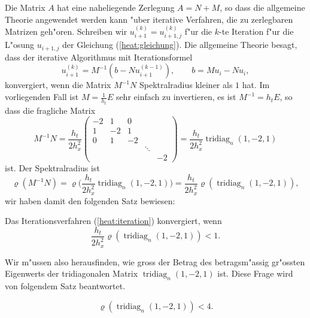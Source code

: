 Die Matrix $A$ hat eine naheliegende Zerlegung $A=N+M$, so dass
die allgemeine Theorie angewendet werden kann "uber iterative Verfahren,
die zu zerlegbaren Matrizen geh"oren.
Schreiben wir $u^{(k)}_{i+1}=u^{(k)}_{i+1,j}$ f"ur die $k$-te Iteration f"ur die
L"osung $u_{i+1,j}$ der Gleichung (\ref{heat:gleichung}).
Die allgemeine Theorie besagt, dass der iterative Algorithmus mit
Iterationsformel
\begin{equation}
u^{(k)}_{i+1}=M^{-1}(b-Nu_{i+1}^{(k-1)}),\qquad b=Mu_{i}-Nu_{i},
\label{heat:iteration}
\end{equation}
konvergiert, wenn die Matrix $M^{-1}N$ Spektralradius kleiner als $1$ hat.
Im vorliegenden Fall ist $M=\frac1{h_t}E$ sehr einfach zu invertieren,
es ist $M^{-1}=h_tE$, so dass die fragliche Matrix 
\[
M^{-1}N=\frac{h_t}{2h_x^2}
\begin{pmatrix}
-2& 1& 0&      &  \\
 1&-2& 1&      &  \\
 0& 1&-2&      &  \\
  &  &  &\ddots&  \\
  &  &  &      &-2
\end{pmatrix}
=\frac{h_t}{2h_x^2}\operatorname{tridiag}_n(1,-2,1)
\]
ist.
Der Spektralradius ist
\[
\varrho(M^{-1}N)
=
\varrho\biggl(\frac{h_t}{2h_x^2}\operatorname{tridiag}_n(1,-2,1)\biggr)
=
\frac{h_t}{2h_x^2}\varrho(\operatorname{tridiag}_n(1,-2,1)),
\]
wir haben damit den folgenden Satz bewiesen:

\begin{satz}
Das Iterationsverfahren (\ref{heat:iteration}) konvergiert, wenn 
\[
\frac{h_t}{2h_x^2}\varrho(\operatorname{tridiag}_n(1,-2,1))<1.
\]
\end{satz}

Wir m"ussen also herausfinden, wie gross der Betrag des
betragsm"assig gr"ossten Eigenwerts
der tridiagonalen Matrix $\operatorname{tridiag}_n(1,-2,1)$ ist.
Diese Frage wird von folgendem Satz beantwortet.

\begin{satz}
\[
\varrho(\operatorname{tridiag}_n(1,-2,1))<4.
\]
\end{satz}

